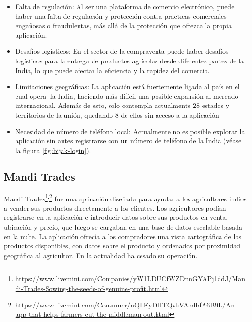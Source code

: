 \begin{itemize}

	\item Falta de regulación: Al ser una plataforma de comercio electrónico, puede haber una falta de regulación y protección contra prácticas comerciales engañosas o fraudulentas, más allá de la protección que ofrezca la propia aplicación.
	
	\item Desafíos logísticos: En el sector de la compraventa puede haber desafíos logísticos para la entrega de productos agrícolas desde diferentes partes de la India, lo que puede afectar la eficiencia y la rapidez del comercio.

	\item Limitaciones geográficas: La aplicación está fuertemente ligada al país en el cual opera, la India, haciendo más difícil una posible expansión al mercado internacional. Además de esto, solo contempla actualmente 28 estados y territorios de la unión, quedando 8 de ellos sin acceso a la aplicación.

	\item Necesidad de número de teléfono local: Actualmente no es posible explorar la aplicación sin antes registrarse con un número de teléfono de la India (véase la figura \ref{fig:bijak-login}).
	
\end{itemize}


\subsection{Mandi Trades}

Mandi Trades\footnote{\url{https://www.livemint.com/Companies/yW1LDUCfWZDnnGYAPj1ddJ/Mandi-Trades-Sowing-the-seeds-of-genuine-profit.html}}\textsuperscript{,}\footnote{\url{https://www.livemint.com/Consumer/nQLEyDHTQvkVAodbfA6B9L/An-app-that-helps-farmers-cut-the-middleman-out.html}} fue una aplicación diseñada para ayudar a los agricultores indios a vender sus productos directamente a los clientes. Los agricultores podían registrarse en la aplicación e introducir datos sobre sus productos en venta, ubicación y precio, que luego se cargaban en una base de datos escalable basada en la nube. La aplicación ofrecía a los compradores una vista cartográfica de los productos disponibles, con datos sobre el producto y ordenados por proximidad geográfica al agricultor. En la actualidad ha cesado su operación.

